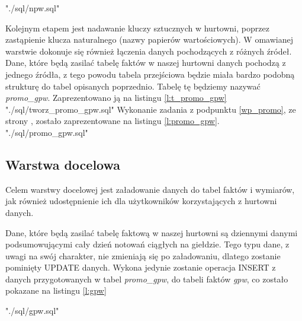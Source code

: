  {"./sql/npw.sql"}  

Kolejnym etapem jest nadawanie kluczy sztucznych w hurtowni,
 poprzez zastąpienie klucza naturalnego (nazwy papierów wartościowych).
W omawianej warstwie  dokonuje się również  łączenia danych pochodzących z różnych źródeł.
Dane, które będą zasilać tabelę faktów w naszej hurtowni danych pochodzą z jednego źródła, 
 z tego powodu tabela przejściowa będzie miała bardzo podobną strukturę do tabel opisanych poprzednio.
Tabelę tę będziemy nazywać \textit{promo\_gpw}. Zaprezentowano ją  na listingu \ref{l:t_promo_gpw}
 {"./sql/tworz_promo_gpw.sql"} 
Wykonanie zadania z podpunktu  \ref{wp_promo}, ze strony \pageref{wp_promo}, 
zostało zaprezentowane na listingu \ref{l:promo_gpw}.
 {"./sql/promo_gpw.sql"} 



\subsection{Warstwa docelowa} \label{warstwa_docelowa}
Celem warstwy docelowej jest załadowanie danych do tabel faktów i wymiarów,
 jak również udostępnienie ich dla użytkowników korzystających z hurtowni danych.

Dane, które będą zasilać tabelę faktową w naszej hurtowni są dziennymi danymi podsumowującymi cały dzień notowań ciągłych na giełdzie. 
Tego typu dane, 
 z uwagi na swój charakter,
 nie zmieniają się po załadowaniu,
 dlatego zostanie pominięty UPDATE danych. 
Wykona jedynie zostanie operacja INSERT z danych 
 przygotowanych w tabel \textit{promo\_gpw}, do tabeli faktów \textit{gpw}, 
 co zostało pokazane na listingu \ref{l:gpw}

 {"./sql/gpw.sql"} 


